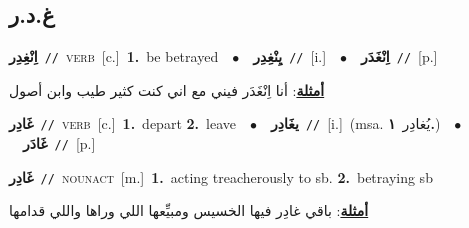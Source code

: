 \documentclass[10pt,a4paper,twoside]{article} %
\begin{document}
\begin{multicols}{2}
{{{\vspace{-3mm}
\subsection*{\color{blue}\foreignlanguage{arabic}{غ.د.ر}\color{blue}{}} 

{\setlength\topsep{0pt}\textbf{\foreignlanguage{arabic}{اِنْغِدِر}}\ {\color{gray}\texttt{//}\color{black}}\ \textsc{verb}\ [c.]\ \textbf{1.}~be betrayed\ \ $\bullet$\ \ \setlength\topsep{0pt}\textbf{\foreignlanguage{arabic}{يِنْغِدِر}}\ {\color{gray}\texttt{//}\color{black}}\ [i.]\ \ $\bullet$\ \ \setlength\topsep{0pt}\textbf{\foreignlanguage{arabic}{اِنْغَدَر}}\ {\color{gray}\texttt{//}\color{black}}\ [p.]\  \begin{flushright}\color{gray}\foreignlanguage{arabic}{\textbf{\underline{\foreignlanguage{arabic}{أمثلة}}}: أنا اِنْغَدَر فيني مع اني كنت كثير طيب وابن أصول}\end{flushright}\color{black}} \vspace{2mm}

{\setlength\topsep{0pt}\textbf{\foreignlanguage{arabic}{غَادِر}}\ {\color{gray}\texttt{//}\color{black}}\ \textsc{verb}\ [c.]\ \textbf{1.}~depart  \textbf{2.}~leave\ \ $\bullet$\ \ \setlength\topsep{0pt}\textbf{\foreignlanguage{arabic}{يغَادِر}}\ {\color{gray}\texttt{//}\color{black}}\ [i.]\ \color{gray}(msa. \foreignlanguage{arabic}{يُغادِر}~\foreignlanguage{arabic}{\textbf{١.}})\color{black}\ \ $\bullet$\ \ \setlength\topsep{0pt}\textbf{\foreignlanguage{arabic}{غَادَر}}\ {\color{gray}\texttt{//}\color{black}}\ [p.]\ 

{\setlength\topsep{0pt}\textbf{\foreignlanguage{arabic}{غَادِر}}\ {\color{gray}\texttt{//}\color{black}}\ \textsc{noun\textunderscore act}\ [m.]\ \textbf{1.}~acting treacherously to sb.  \textbf{2.}~betraying sb\  \begin{flushright}\color{gray}\foreignlanguage{arabic}{\textbf{\underline{\foreignlanguage{arabic}{أمثلة}}}: باقي غادِر فيها الخسيس ومبيِّعها اللي وراها واللي قدامها}\end{flushright}\color{black}} \vspace{2mm}

}}}}
\end{multicols}
\end{document}
